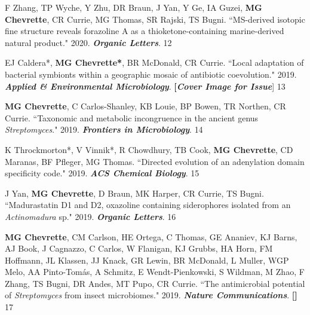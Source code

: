 \begin{cvpubs}
\cvpub
{F Zhang, TP Wyche, Y Zhu, DR Braun, J Yan, Y Ge, IA Guzei, \textbf{MG Chevrette}, CR Currie, MG Thomas, SR Rajski, TS Bugni. ``MS-derived isotopic fine structure reveals forazoline A as a thioketone-containing marine-derived natural product." 2020. \textit{\textbf{Organic Letters}}. \textbf{\textit{}}}
{12}

\cvpub
{EJ Caldera*, \textbf{MG Chevrette*}, BR McDonald, CR Currie. ``Local adaptation of bacterial symbionts within a geographic mosaic of antibiotic coevolution." 2019. \textit{\textbf{Applied \& Environmental Microbiology}}. \textbf{\textit{}} \textbf{[\textit{Cover Image for Issue}}]}
{13}

\end{cvpubs} \begin{cvpubs}

\cvpub
{\textbf{MG Chevrette}, C Carlos-Shanley, KB Louie, BP Bowen, TR Northen, CR Currie. ``Taxonomic and metabolic incongruence in the ancient genus \textit{Streptomyces}." 2019. \textit{\textbf{Frontiers in Microbiology}}. \textbf{\textit{}}}
{14}

\cvpub
{K Throckmorton*, V Vinnik*, R Chowdhury, TB Cook, \textbf{MG Chevrette}, CD Maranas, BF Pfleger, MG Thomas. ``Directed evolution of an adenylation domain specificity code." 2019. \textit{\textbf{ACS Chemical Biology}}. \textbf{\textit{}}}
{15}

\cvpub
{J Yan, \textbf{MG Chevrette}, D Braun, MK Harper, CR Currie, TS Bugni. ``Madurastatin D1 and D2, oxazoline containing siderophores isolated from an \textit{Actinomadura} sp." 2019. \textit{\textbf{Organic Letters}}. \textbf{\textit{}}}
{16}

\cvpub
{\textbf{MG Chevrette}, CM Carlson, HE Ortega, C Thomas, GE Ananiev, KJ Barns, AJ Book, J Cagnazzo, C Carlos, W Flanigan, KJ Grubbs, HA Horn, FM Hoffmann, JL Klassen, JJ Knack, GR Lewin, BR McDonald, L Muller, WGP Melo, AA Pinto-Tom\'{a}s, A Schmitz, E Wendt-Pienkowski, S Wildman, M Zhao, F Zhang, TS Bugni, DR Andes, MT Pupo, CR Currie. ``The antimicrobial potential of \textit{Streptomyces} from insect microbiomes." 2019. \textit{\textbf{Nature Communications}}. \textbf{\textit{}} \linebreak \textbf{[\textit{}]}}
{17}


\end{cvpubs}
